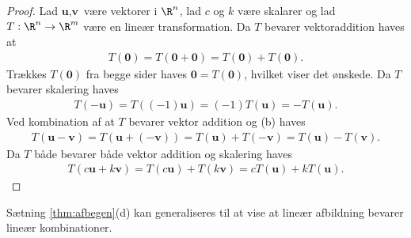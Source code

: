%
\begin{proof}
Lad $\textbf{u}, \textbf{v}$ være vektorer i $\R^n$, lad $c$ og $k$ være skalarer og lad $T: \R^n \rightarrow \R^m$ være en lineær transformation.
Da $T$ bevarer vektoraddition haves at
%
\begin{align*}
T(\textbf{0}) = T(\textbf{0} + \textbf{0}) = T(\textbf{0}) + T(\textbf{0}).
\end{align*}
%
Trækkes $T(\textbf{0})$ fra begge sider haves $\textbf{0} = T(\textbf{0})$, hvilket viser det ønskede.
%
Da $T$ bevarer skalering haves
% 
\begin{align*}
T(-\textbf{u}) = T((-1)\textbf{u}) = (-1)T(\textbf{u}) = -T(\textbf{u}).
\end{align*}
%
Ved kombination af at $T$ bevarer vektor addition og (b) haves
%
\begin{align*}
T(\textbf{u}-\textbf{v}) = T(\textbf{u}+(-\textbf{v})) = T(\textbf{u})+T(-\textbf{v}) = T(\textbf{u}) - T(\textbf{v}).
\end{align*}
%
Da $T$ både bevarer både vektor addition og skalering haves 
%
\begin{align*}
T(c\textbf{u} + k\textbf{v}) = T(c\textbf{u}) + T(k\textbf{v}) = cT(\textbf{u}) + kT(\textbf{u}).
\end{align*}
\end{proof}
%
Sætning \ref{thm:afbegen}(d) kan generaliseres til at vise at lineær afbildning bevarer lineær kombinationer.
%
\begin{lem}{}{}

\end{lem}